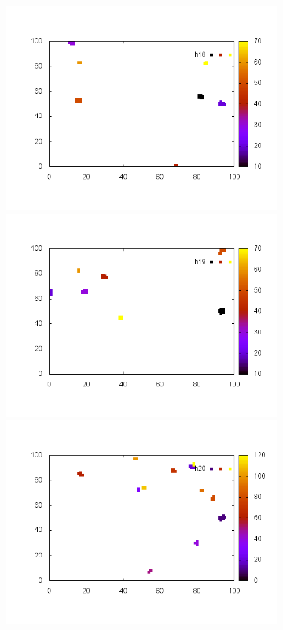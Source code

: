 \documentclass[10pt,a4paper]{article}
\begin{document}
\begin{figure}
\begin{subfigure}[b]{1\textwidth}
\includegraphics[scale=.3]{./img/SCC_Stable3/cut99p/18.png}
\includegraphics[scale=.3]{./img/SCC_Stable3/cut99p/19.png}
\includegraphics[scale=.3]{./img/SCC_Stable3/cut99p/20.png}

\end{subfigure}
\end{figure}
\end{document}
